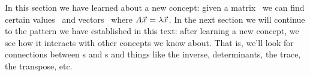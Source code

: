 In this section we have learned about a new concept: given a matrix \tta\ we can find certain values \lda\ and vectors \vx\ where $A\vec{x_{}} =\lambda\vec{x_{}}$. In the next section we will continue to the pattern we have established in this text: after learning a new concept, we see how it interacts with other concepts we know about. That is, we'll look for connections between \el s and \ev s and things like the inverse, determinants, the trace, the transpose, etc.\\

